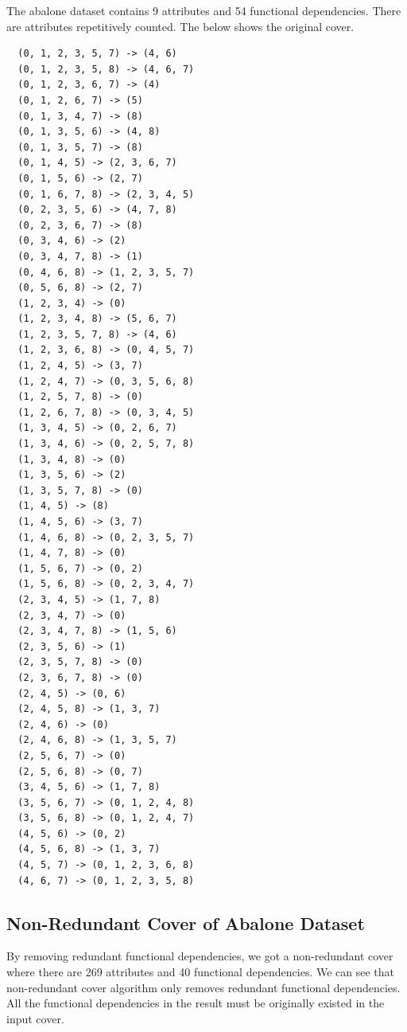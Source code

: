 \documentclass[11pt]{book}
\begin{document}
The abalone dataset contains 9 attributes and 54 functional dependencies. There are attributes repetitively counted. The below shows the original cover.

\begin{verbatim}
  (0, 1, 2, 3, 5, 7) -> (4, 6)
  (0, 1, 2, 3, 5, 8) -> (4, 6, 7)
  (0, 1, 2, 3, 6, 7) -> (4)
  (0, 1, 2, 6, 7) -> (5)
  (0, 1, 3, 4, 7) -> (8)
  (0, 1, 3, 5, 6) -> (4, 8)
  (0, 1, 3, 5, 7) -> (8)
  (0, 1, 4, 5) -> (2, 3, 6, 7)
  (0, 1, 5, 6) -> (2, 7)
  (0, 1, 6, 7, 8) -> (2, 3, 4, 5)
  (0, 2, 3, 5, 6) -> (4, 7, 8)
  (0, 2, 3, 6, 7) -> (8)
  (0, 3, 4, 6) -> (2)
  (0, 3, 4, 7, 8) -> (1)
  (0, 4, 6, 8) -> (1, 2, 3, 5, 7)
  (0, 5, 6, 8) -> (2, 7)
  (1, 2, 3, 4) -> (0)
  (1, 2, 3, 4, 8) -> (5, 6, 7)
  (1, 2, 3, 5, 7, 8) -> (4, 6)
  (1, 2, 3, 6, 8) -> (0, 4, 5, 7)
  (1, 2, 4, 5) -> (3, 7)
  (1, 2, 4, 7) -> (0, 3, 5, 6, 8)
  (1, 2, 5, 7, 8) -> (0)
  (1, 2, 6, 7, 8) -> (0, 3, 4, 5)
  (1, 3, 4, 5) -> (0, 2, 6, 7)
  (1, 3, 4, 6) -> (0, 2, 5, 7, 8)
  (1, 3, 4, 8) -> (0)
  (1, 3, 5, 6) -> (2)
  (1, 3, 5, 7, 8) -> (0)
  (1, 4, 5) -> (8)
  (1, 4, 5, 6) -> (3, 7)
  (1, 4, 6, 8) -> (0, 2, 3, 5, 7)
  (1, 4, 7, 8) -> (0)
  (1, 5, 6, 7) -> (0, 2)
  (1, 5, 6, 8) -> (0, 2, 3, 4, 7)
  (2, 3, 4, 5) -> (1, 7, 8)
  (2, 3, 4, 7) -> (0)
  (2, 3, 4, 7, 8) -> (1, 5, 6)
  (2, 3, 5, 6) -> (1)
  (2, 3, 5, 7, 8) -> (0)
  (2, 3, 6, 7, 8) -> (0)
  (2, 4, 5) -> (0, 6)
  (2, 4, 5, 8) -> (1, 3, 7)
  (2, 4, 6) -> (0)
  (2, 4, 6, 8) -> (1, 3, 5, 7)
  (2, 5, 6, 7) -> (0)
  (2, 5, 6, 8) -> (0, 7)
  (3, 4, 5, 6) -> (1, 7, 8)
  (3, 5, 6, 7) -> (0, 1, 2, 4, 8)
  (3, 5, 6, 8) -> (0, 1, 2, 4, 7)
  (4, 5, 6) -> (0, 2)
  (4, 5, 6, 8) -> (1, 3, 7)
  (4, 5, 7) -> (0, 1, 2, 3, 6, 8)
  (4, 6, 7) -> (0, 1, 2, 3, 5, 8)
\end{verbatim}

\subsection{Non-Redundant Cover of Abalone Dataset}

By removing redundant functional dependencies, we got a non-redundant cover where there are 269 attributes and 40 functional dependencies. We can see that non-redundant cover algorithm only removes redundant functional dependencies. All the functional dependencies in the result must be originally existed in the input cover.
\end{document}
